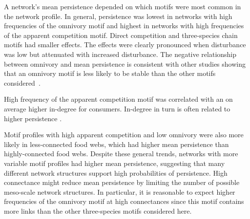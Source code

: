 \documentclass[12pt]{article}
\begin{document}
\begin{spacing}{2.0}


A network's mean persistence depended on which motifs were most common in the network profile. In general, persistence was lowest in networks with high frequencies of the omnivory motif and highest in networks with high frequencies of the apparent competition motif. Direct competition and three-species chain motifs had smaller effects. The effects were clearly pronounced when disturbance was low but attenuated with increased disturbance.
The negative relationship between omnivory and mean persistence is consistent with other studies showing that an omnivory motif is less likely to be stable than the other motifs considered~\citep{Borrelli2015a}.

High frequency of the apparent competition motif was correlated with an on average higher in-degree for consumers. In-degree in turn is often related to higher persistence \citep{}. 

Motif profiles with high apparent competition and low omnivory were also more likely in less-connected food webs, which had higher mean persistence than highly-connected food webs.
Despite these general trends, networks with more variable motif profiles had higher mean persistence, suggesting that many different network structures support high probabilities of persistence. 
High connectance might reduce mean persistence by limiting the number of possible meso-scale network structures.
In particular, it is reasonable to expect higher frequencies of the omnivory motif at high connectances since this motif contains more links than the other three-species motifs considered here.



\end{spacing}
\end{document}
